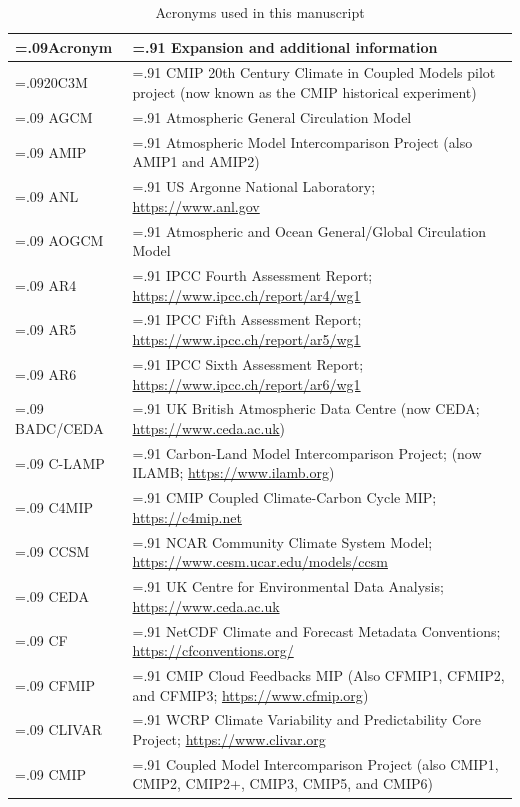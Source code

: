 \documentclass[gmd, preprint]{copernicus}
\begin{document}
\begin{table}[htp]
\renewcommand{\arraystretch}{2}
\scriptsize
\centering
\caption{Acronyms used in this manuscript}
\resizebox{\textwidth}{!} {
	\begin{tabularx}{1\textwidth} { 
	  | >{\raggedright\arraybackslash\hsize=.09\hsize}X
	  | >{\centering\arraybackslash\hsize=.91\hsize}X | }
\hline
\textbf{Acronym} & \textbf{Expansion and additional information}\\ \hline
20C3M & CMIP 20th Century Climate in Coupled Models pilot project (now known as the CMIP historical experiment)\\ \hline
AGCM & Atmospheric General Circulation Model\\ \hline
AMIP & Atmospheric Model Intercomparison Project (also AMIP1 and AMIP2)\\ \hline
ANL & US Argonne National Laboratory; \url{https://www.anl.gov}\\ \hline
AOGCM & Atmospheric and Ocean General/Global Circulation Model\\ \hline
AR4 & IPCC Fourth Assessment Report; \url{https://www.ipcc.ch/report/ar4/wg1}\\ \hline
AR5 & IPCC Fifth Assessment Report; \url{https://www.ipcc.ch/report/ar5/wg1}\\ \hline
AR6 & IPCC Sixth Assessment Report; \url{https://www.ipcc.ch/report/ar6/wg1}\\ \hline
BADC/CEDA & UK British Atmospheric Data Centre (now CEDA; \url{https://www.ceda.ac.uk})\\ \hline
C-LAMP & Carbon-Land Model Intercomparison Project; (now ILAMB; \url{https://www.ilamb.org})\\ \hline
C4MIP & CMIP Coupled Climate-Carbon Cycle MIP; \url{https://c4mip.net}\\ \hline
CCSM & NCAR Community Climate System Model; \url{https://www.cesm.ucar.edu/models/ccsm}\\ \hline
CEDA & UK Centre for Environmental Data Analysis; \url{https://www.ceda.ac.uk}\\ \hline
CF & NetCDF Climate and Forecast Metadata Conventions; \url{https://cfconventions.org/}\\ \hline
CFMIP & CMIP Cloud Feedbacks MIP (Also CFMIP1, CFMIP2, and CFMIP3; \url{https://www.cfmip.org})\\ \hline
CLIVAR & WCRP Climate Variability and Predictability Core Project; \url{https://www.clivar.org}\\ \hline
CMIP & Coupled Model Intercomparison Project (also CMIP1, CMIP2, CMIP2+, CMIP3, CMIP5, and CMIP6)\\ \hline

\end{tabularx}}
\end{table}
\end{document}
